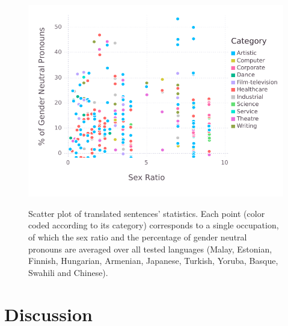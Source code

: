 \documentclass{article}
\begin{document}
\begin{figure}[H]
	\centering
	\includegraphics[width=\linewidth]{pictures/scatterplot-languages}
	\label{fig:scatterplot-languages}
	\caption{Scatter plot of translated sentences' statistics. Each point (color coded according to its category) corresponds to a single occupation, of which the sex ratio and the percentage of gender neutral pronouns are averaged over all tested languages (Malay, Estonian, Finnish, Hungarian, Armenian, Japanese, Turkish, Yoruba, Basque, Swahili and Chinese).}
\end{figure}

\section{Discussion}



\end{document}
